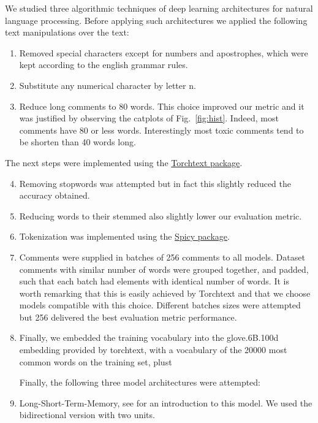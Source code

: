 \documentclass{report}
\begin{document}
We studied three algorithmic techniques of deep learning architectures for natural
language processing. Before applying such architectures we applied the following 
text manipulations over the text:
\begin{enumerate}
\item Removed special characters except for numbers and apostrophes, which
were kept according to the english grammar rules.
\item Substitute any numerical character by letter n.
\item Reduce long comments to 80 words. This choice improved our metric 
and it was justified by observing the catplots of Fig.~\ref{fig:hist}. Indeed, 
most comments have 80 or less words. Interestingly most toxic comments tend 
to be shorten than 40 words long.
\end{enumerate}
The next steps were implemented using the \href{https://torchtext.readthedocs.io/en/latest/}{Torchtext package}. 
\begin{enumerate}
 \setcounter{enumi}{3}
\item Removing stopwords was attempted but in fact this slightly reduced the
accuracy obtained. 
\item Reducing words to their stemmed also slightly lower our evaluation metric.
\item Tokenization was implemented using the \href{https://scipy.org/scipylib/}{Spicy package}.


\item Comments were supplied in batches of 256 comments to all models. Dataset 
comments with similar number of words were grouped together, and padded, such that 
each batch had elements with identical number of words. It is worth remarking that this is
easily achieved by Torchtext and that we choose models compatible with this choice. Different 
batches sizes were attempted but 256 delivered the best evaluation metric performance. 

\item Finally, we embedded the training vocabulary into the glove.6B.100d embedding 
provided by torchtext, with a vocabulary of the 20000 most common words on the
training set, plust 

Finally, the following three model architectures were attempted:
\item Long-Short-Term-Memory, see \cite{NG} for an introduction to this model. We used the 
bidirectional version with two units. 


\end{enumerate}
\end{document}

